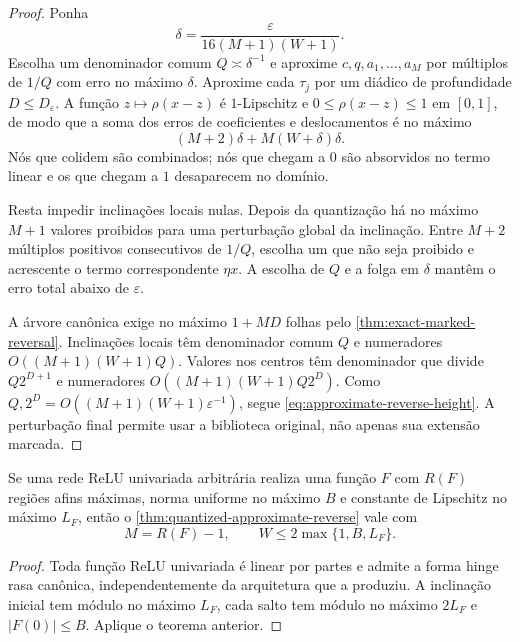 \begin{proof}
Ponha
\[
 \delta=\frac{\varepsilon}{16(M+1)(W+1)}.
\]
Escolha um denominador comum $Q\asymp\delta^{-1}$ e aproxime
$c,q,a_1,\ldots,a_M$ por múltiplos de $1/Q$ com erro no máximo $\delta$.
Aproxime cada $\tau_j$ por um diádico de profundidade
$D\le D_\varepsilon$. A função $z\mapsto\rho(x-z)$ é $1$-Lipschitz e
$0\le\rho(x-z)\le1$ em $[0,1]$, de modo que a soma dos erros de coeficientes
e deslocamentos é no máximo
\[
 (M+2)\delta+M(W+\delta)\delta.
\]
Nós que colidem são combinados; nós que chegam a $0$ são absorvidos no termo
linear e os que chegam a $1$ desaparecem no domínio.

Resta impedir inclinações locais nulas. Depois da quantização há no máximo
$M+1$ valores proibidos para uma perturbação global da inclinação. Entre
$M+2$ múltiplos positivos consecutivos de $1/Q$, escolha um que não seja
proibido e acrescente o termo correspondente $\eta x$. A escolha de $Q$ e a
folga em $\delta$ mantêm o erro total abaixo de $\varepsilon$.

A árvore canônica exige no máximo $1+MD$ folhas pelo
\cref{thm:exact-marked-reversal}. Inclinações locais têm denominador comum
$Q$ e numeradores $O((M+1)(W+1)Q)$. Valores nos centros têm denominador que
divide $Q2^{D+1}$ e numeradores
$O((M+1)(W+1)Q2^D)$. Como
$Q,2^D=O((M+1)(W+1)\varepsilon^{-1})$, segue
\eqref{eq:approximate-reverse-height}. A perturbação final permite usar a
biblioteca original, não apenas sua extensão marcada.
\end{proof}

\begin{corollary}
\label{cor:deep-functional-reverse}
Se uma rede ReLU univariada arbitrária realiza uma função $F$ com $R(F)$
regiões afins máximas, norma uniforme no máximo $B$ e constante de Lipschitz
no máximo $L_F$, então o \cref{thm:quantized-approximate-reverse} vale com
\begin{equation}
 M=R(F)-1,
 \qquad
 W\le2\max\{1,B,L_F\}.
 \label{eq:deep-realized-resources}
\end{equation}
\end{corollary}

\begin{proof}
Toda função ReLU univariada é linear por partes e admite a forma hinge rasa
canônica, independentemente da arquitetura que a produziu. A inclinação
inicial tem módulo no máximo $L_F$, cada salto tem módulo no máximo $2L_F$ e
$|F(0)|\le B$. Aplique o teorema anterior.
\end{proof}

